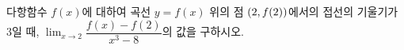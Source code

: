 다항함수 $f(x)$에 대하여 곡선 $y=f(x)$ 위의 점 $(2{,}\mkern3mu\mathopen{}f(2))$에서의 접선의 기울기가 $3$일 때, $\displaystyle\lim_{x\to 2}\dfrac{f(x)-f(2)}{x^3-8}$의 값을 구하시오.
